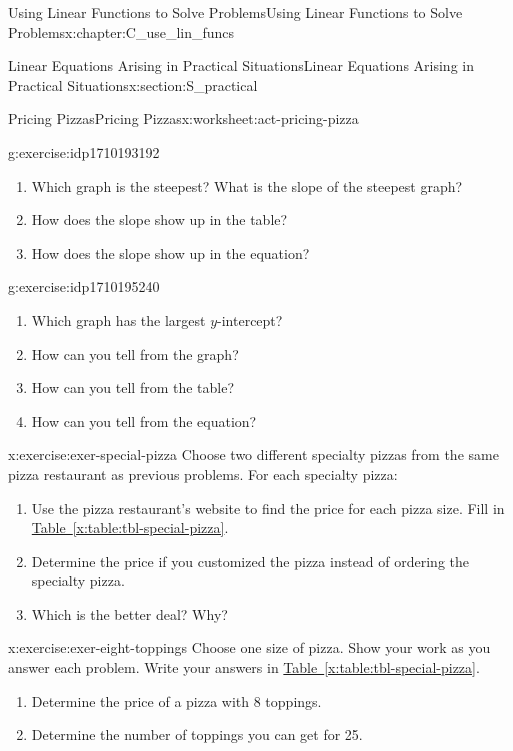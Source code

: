 \documentclass[oneside,10pt,]{book}
\newcommand{\xreffont}{\relax}
\numberwithin{equation}{chapter}
\begin{document}
\begin{chapterptx}{Using Linear Functions to Solve Problems}{}{Using Linear Functions to Solve Problems}{}{}{x:chapter:C_use_lin_funcs}
\begin{sectionptx}{Linear Equations Arising in Practical Situations}{}{Linear Equations Arising in Practical Situations}{}{}{x:section:S_practical}
\begin{worksheet-subsection}{Pricing Pizzas}{}{Pricing Pizzas}{}{}{x:worksheet:act-pricing-pizza}
\begin{divisionexercise}{5}{}{}{g:exercise:idp1710193192}
\begin{enumerate}[font=\bfseries,label=(\alph*),ref=\alph*]
\item{}Which graph is the steepest? What is the slope of the steepest graph?%
\item{}How does the slope show up in the table?%
\item{}How does the slope show up in the equation?%
\end{enumerate}
\end{divisionexercise}%
\begin{divisionexercise}{6}{}{}{g:exercise:idp1710195240}%
\begin{enumerate}[font=\bfseries,label=(\alph*),ref=\alph*]
\item{}Which graph has the largest \(y\)-intercept?%
\item{}How can you tell from the graph?%
\item{}How can you tell from the table?%
\item{}How can you tell from the equation?%
\end{enumerate}
\end{divisionexercise}%
\begin{divisionexercise}{7}{}{}{x:exercise:exer-special-pizza}%
Choose two different specialty pizzas from the same pizza restaurant as previous problems. For each specialty pizza:%
\begin{enumerate}[font=\bfseries,label=(\alph*),ref=\alph*]
\item{}Use the pizza restaurant's website to find the price for each pizza size. Fill in \hyperref[x:table:tbl-special-pizza]{Table~{\xreffont\ref{x:table:tbl-special-pizza}}}.%
\item{}Determine the price if you customized the pizza instead of ordering the specialty pizza.%
\item{}Which is the better deal? Why?%
\end{enumerate}
\end{divisionexercise}%
\begin{divisionexercise}{8}{}{}{x:exercise:exer-eight-toppings}%
Choose one size of pizza. Show your work as you answer each problem. Write your answers in \hyperref[x:table:tbl-special-pizza]{Table~{\xreffont\ref{x:table:tbl-special-pizza}}}.%
\begin{enumerate}[font=\bfseries,label=(\alph*),ref=\alph*]
\item{}Determine the price of a pizza with 8 toppings.%
\item{}Determine the number of toppings you can get for \textdollar{}25.%
\end{enumerate}

\end{divisionexercise}
\end{worksheet-subsection}
\end{sectionptx}
\end{chapterptx}
\end{document}
